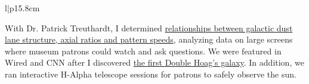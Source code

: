 \documentclass[a4paper, 9pt]{article} %
\begin{document}
\begin{tabular}{l|p{15.8cm}}
\begin{minipage}[t]{\linewidth}
\begin{itemize}[nosep, after=\strut, leftmargin=*]
{\item With Dr. Patrick Treuthardt, I determined \href{https://ui.adsabs.harvard.edu/abs/2014AAS...22345312T/abstract}{relationships between galactic dust lane structure, axial ratios and pattern speeds}, analyzing data on large screens where museum patrons could watch and ask questions. We were featured in Wired and CNN after I discovered \href{https://www.sciencealert.com/scientists-just-discovered-a-brand-new-type-of-galaxy}{the first Double Hoag's galaxy}. In addition, we ran interactive H-Alpha telescope sessions for patrons to safely observe the sun.}
\end{itemize}
\end{minipage}\\




\end{tabular}
\end{document}
